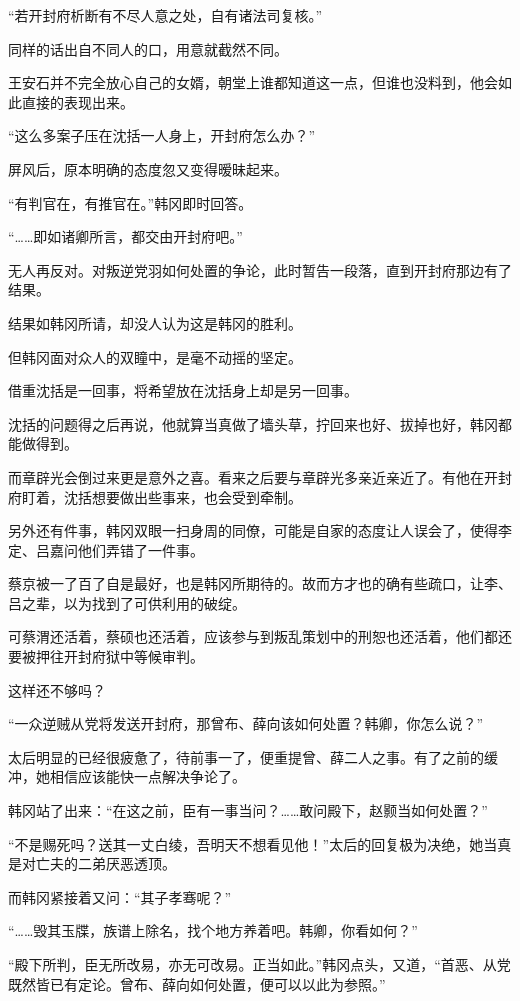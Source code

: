 “若开封府析断有不尽人意之处，自有诸法司复核。”

同样的话出自不同人的口，用意就截然不同。

王安石并不完全放心自己的女婿，朝堂上谁都知道这一点，但谁也没料到，他会如此直接的表现出来。

“这么多案子压在沈括一人身上，开封府怎么办？”

屏风后，原本明确的态度忽又变得暧昧起来。

“有判官在，有推官在。”韩冈即时回答。

“……即如诸卿所言，都交由开封府吧。”

无人再反对。对叛逆党羽如何处置的争论，此时暂告一段落，直到开封府那边有了结果。

结果如韩冈所请，却没人认为这是韩冈的胜利。

但韩冈面对众人的双瞳中，是毫不动摇的坚定。

借重沈括是一回事，将希望放在沈括身上却是另一回事。

沈括的问题得之后再说，他就算当真做了墙头草，拧回来也好、拔掉也好，韩冈都能做得到。

而章辟光会倒过来更是意外之喜。看来之后要与章辟光多亲近亲近了。有他在开封府盯着，沈括想要做出些事来，也会受到牵制。

另外还有件事，韩冈双眼一扫身周的同僚，可能是自家的态度让人误会了，使得李定、吕嘉问他们弄错了一件事。

蔡京被一了百了自是最好，也是韩冈所期待的。故而方才也的确有些疏口，让李、吕之辈，以为找到了可供利用的破绽。

可蔡渭还活着，蔡硕也还活着，应该参与到叛乱策划中的刑恕也还活着，他们都还要被押往开封府狱中等候审判。

这样还不够吗？

“一众逆贼从党将发送开封府，那曾布、薛向该如何处置？韩卿，你怎么说？”

太后明显的已经很疲惫了，待前事一了，便重提曾、薛二人之事。有了之前的缓冲，她相信应该能快一点解决争论了。

韩冈站了出来：“在这之前，臣有一事当问？……敢问殿下，赵颢当如何处置？”

“不是赐死吗？送其一丈白绫，吾明天不想看见他！”太后的回复极为决绝，她当真是对亡夫的二弟厌恶透顶。

而韩冈紧接着又问：“其子孝骞呢？”

“……毁其玉牒，族谱上除名，找个地方养着吧。韩卿，你看如何？”

“殿下所判，臣无所改易，亦无可改易。正当如此。”韩冈点头，又道，“首恶、从党既然皆已有定论。曾布、薛向如何处置，便可以以此为参照。”

